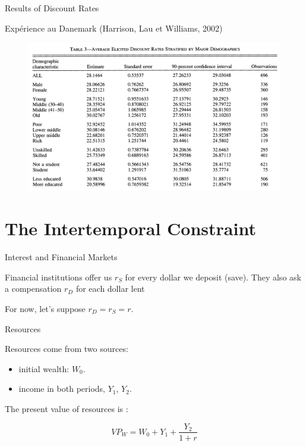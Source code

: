 \documentclass[handout]{beamer}
\begin{document}
\begin{frame}{Results of Discount Rates}

Expérience au Danemark  (Harrison, Lau et Williams, 2002)

\begin{figure}
\includegraphics[scale=0.5]{Results.png}
\end{figure}

\end{frame}

\section{The Intertemporal Constraint}

\begin{frame}{Interest and Financial Markets}

Financial institutions offer us $r_S$ for every dollar we deposit (save). They also ask a compensation $r_D$ for each dollar lent

For now, let's suppose $r_D = r_S = r$. 

\end{frame}

\begin{frame}{Resources}

Resources come from two sources:
\begin{itemize}
\item initial wealth: $W_0$. 
\item income in both periods, $Y_1$, $Y_2$. 
\end{itemize}

The present value of resources is : 

$$ VP_W = W_0 + Y_1 + \frac{Y_2}{1+r} $$
 
\end{frame}
\end{document}

